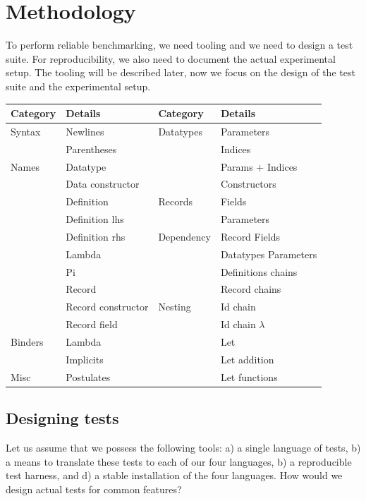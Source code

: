 \documentclass[a4paper,UKenglish,cleveref, autoref, thm-restate,anonymous]{lipics-v2021}
\begin{document}
\section{Methodology}
\label{sec:method}

To perform reliable benchmarking, we need tooling and we need to design
a test suite. For reproducibility, we also need to document the actual
experimental setup. The tooling will be described later,
now we focus on the design of the test suite and the experimental setup.

\begin{tabular}{l|l||l|l}
\textbf{Category} & \textbf{Details} & \textbf{Category} & \textbf{Details} \\ \hline
Syntax & Newlines            & Datatypes  & Parameters \\
       & Parentheses         &            & Indices \\
Names  & Datatype            &            & Params + Indices \\
       & Data constructor    &            & Constructors \\
       & Definition          & Records & Fields \\
       & Definition lhs      &         & Parameters \\
       & Definition rhs      & Dependency & Record Fields\\
       & Lambda              &            & Datatypes Parameters\\
       & Pi                  &            & Definitions chains \\
       & Record              &            & Record chains \\
       & Record constructor  & Nesting & Id chain \\
       & Record field        &         & Id chain \(\lambda\) \\
Binders & Lambda             &         & Let \\
        & Implicits          &         & Let addition \\
Misc    & Postulates         &         & Let functions \\
\end{tabular}

\subsection{Designing tests}

Let us assume that we possess the following tools:
a) a single language of tests,
b) a means to translate these tests to each of our four languages,
b) a reproducible test harness, and
d) a stable installation of the four languages.
How would we design actual tests for common features?
\end{document}
